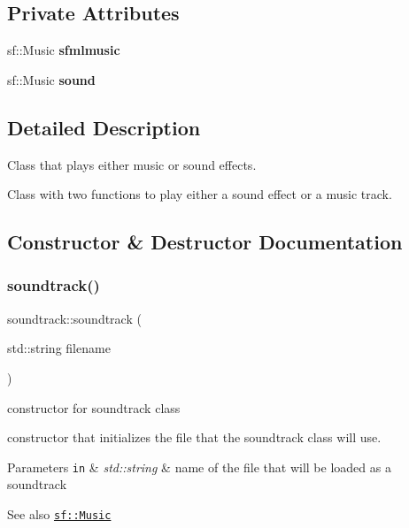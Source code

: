 \subsection*{Private Attributes}
\begin{DoxyCompactItemize}
\item 
\mbox{\label{classsoundtrack_a275bf853875a2855f8bbe30f5e94d7a8}} 
sf\+::\+Music {\bfseries sfmlmusic}
\item 
\mbox{\label{classsoundtrack_a2390f2ad4bd2220e418412cd4ca7e44a}} 
sf\+::\+Music {\bfseries sound}
\end{DoxyCompactItemize}


\subsection{Detailed Description}
Class that plays either music or sound effects. 

Class with two functions to play either a sound effect or a music track. 

\subsection{Constructor \& Destructor Documentation}
\mbox{\label{classsoundtrack_add31bdeb1a693d541443f1d88586d3b6}} 
\subsubsection{\texorpdfstring{soundtrack()}{soundtrack()}}
{\footnotesize\ttfamily soundtrack\+::soundtrack (\begin{DoxyParamCaption}\item[{std\+::string}]{filename }\end{DoxyParamCaption})}



constructor for soundtrack class 

constructor that initializes the file that the soundtrack class will use.


\begin{DoxyParams}[1]{Parameters}
\mbox{\tt in}  & {\em std\+::string} & name of the file that will be loaded as a soundtrack\\
\hline
\end{DoxyParams}
\begin{DoxySeeAlso}{See also}
\href{http://www.sfml-dev.org/documentation/2.0/classsf_1_1Music.php}{\tt sf\+::\+Music} 
\end{DoxySeeAlso}


